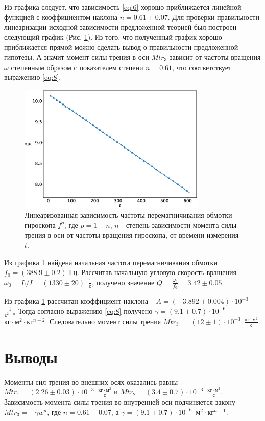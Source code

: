 \documentclass[12pt]{article}
\begin{document}
Из графика следует, что зависимость \ref{eq:6} хорошо приближается линейной функцией с коэффициентом наклона $n = 0.61 \pm 0.07$. 
Для проверки правильности линеаризации исходной зависимости предложенной теорией был построен следующий график (Рис. \ref{fig:5}).
Из того, что полученный график хорошо приближается прямой можно сделать вывод о правильности предложенной гипотезы. А значит момент силы трения
в оси $Mtr_3$ зависит от частоты вращения $\omega$ степенным образом с показателем степени $n = 0.61$, что соответствует выражению \ref{eq:8}.
\begin{figure}[H]
    \begin{center}
        \includegraphics[width=0.8\textwidth]{4.eps}
    \end{center}
    \caption{Линеаризованная зависимость частоты перемагничивания обмотки гироскопа $f^p$, где $p = 1 - n$, $n$ - степень зависимости
    момента силы трения в оси от частоты вращения гироскопа, от времени измерения $t$.}
    \label{fig:5}
\end{figure}
Из графика \ref{fig:5} найдена начальная частота перемагничивания обмотки $f_0 = (388.9 \pm 0.2) \textrm{ Гц}$. Рассчитав начальную угловую скорость
вращения $\omega_0 = L/I = (1330 \pm 20)$~$\frac{1}{\textrm{с}}$, получено значение $Q = \frac{\omega_0}{f_0} = 3.42 \pm 0.05$.

Из графика \ref{fig:5} рассчитан коэффициент наклона $-A = (-3.892 \pm 0.004) \cdot 10^{-3}$~$\frac{1}{\textrm{с}^{2-n}}$
Тогда согласно выражению \ref{eq:8} получено $\gamma = (9.1 \pm 0.7) \cdot 10^{-6}$~$\textrm{кг}\cdot\textrm{м}^2\cdot\textrm{кг}^{n-2}$. 
Следовательно момент силы трения $Mtr_{3_0} = (12 \pm 1) \cdot 10^{-3}$~$\frac{\textrm{кг} \cdot \textrm{м}^2}{\textrm{с}}$.

\section{Выводы}
Моменты сил трения во внешних осях оказались равны $Mtr_1 = (2.26 \pm 0.03) \cdot 10^{-3}$~$\frac{\textrm{кг} \cdot \textrm{м}^2}{\textrm{с}}$ и 
$Mtr_2 = (3.4 \pm 0.7) \cdot 10^{-3}$~$\frac{\textrm{кг} \cdot \textrm{м}^2}{\textrm{с}}$. Зависимость момента силы трения во внутренней оси 
подчиняется закону $Mtr_3 = -\gamma w^n$, где $n = 0.61 \pm 0.07$, а $\gamma = (9.1 \pm 0.7) \cdot 10^{-6}$~$\textrm{м}^2\cdot\textrm{кг}^{n-1}$.
\end{document}

